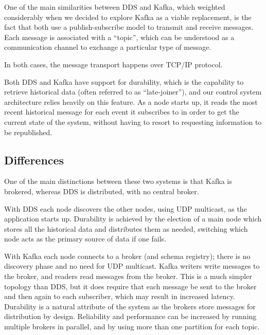 \documentclass[]{spie}  %
\begin{document}
One of the main similarities between DDS and Kafka, which weighted considerably when we decided to explore Kafka as a viable replacement, is the fact that both use a publish-subscribe model to transmit and receive messages.
Each message is associated with a “topic”, which can be understood as a communication channel to exchange a particular type of message.

In both cases, the message transport happens over TCP/IP protocol.

Both DDS and Kafka have support for durability, which is the capability to retrieve historical data (often referred to as “late-joiner”), and our control system architecture relies heavily on this feature.
As a node starts up, it reads the most recent historical message for each event it subscribes to in order to get the current state of the system, without having to resort to requesting information to be republished.


\subsection{Differences}
\label{subsec:differences}

One of the main distinctions between these two systems is that Kafka is brokered, whereas DDS is distributed, with no central broker.

With DDS each node discovers the other nodes, using UDP multicast, as the application starts up.
Durability is achieved by the election of a main node which stores all the historical data and distributes them as needed, switching which node acts as the primary source of data if one fails.

With Kafka each node connects to a broker (and schema registry); there is no discovery phase and no need for UDP multicast.
Kafka writers write messages to the broker, and readers read messages from the broker.
This is a much simpler topology than DDS, but it does require that each message be sent to the broker and then again to each subscriber, which may result in increased latency.
Durability is a natural attribute of the system as the brokers store messages for distribution by design.
Reliability and performance can be increased by running multiple brokers in parallel, and by using more than one partition for each topic.
\end{document}
